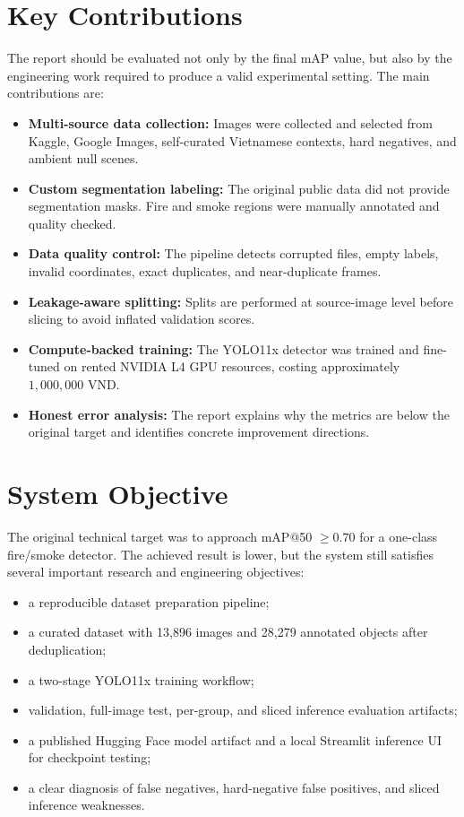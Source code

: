 \documentclass[12pt,a4paper]{report}
\begin{document}
\section{Key Contributions}
The report should be evaluated not only by the final mAP value, but also by the engineering work required to produce a valid experimental setting. The main contributions are:

\begin{itemize}
    \item \textbf{Multi-source data collection:} Images were collected and selected from Kaggle, Google Images, self-curated Vietnamese contexts, hard negatives, and ambient null scenes.
    \item \textbf{Custom segmentation labeling:} The original public data did not provide segmentation masks. Fire and smoke regions were manually annotated and quality checked.
    \item \textbf{Data quality control:} The pipeline detects corrupted files, empty labels, invalid coordinates, exact duplicates, and near-duplicate frames.
    \item \textbf{Leakage-aware splitting:} Splits are performed at source-image level before slicing to avoid inflated validation scores.
    \item \textbf{Compute-backed training:} The YOLO11x detector was trained and fine-tuned on rented NVIDIA L4 GPU resources, costing approximately \(1{,}000{,}000\) VND.
    \item \textbf{Honest error analysis:} The report explains why the metrics are below the original target and identifies concrete improvement directions.
\end{itemize}

\section{System Objective}
The original technical target was to approach mAP@50 \(\geq 0.70\) for a one-class fire/smoke detector. The achieved result is lower, but the system still satisfies several important research and engineering objectives:

\begin{itemize}
    \item a reproducible dataset preparation pipeline;
    \item a curated dataset with 13,896 images and 28,279 annotated objects after deduplication;
    \item a two-stage YOLO11x training workflow;
    \item validation, full-image test, per-group, and sliced inference evaluation artifacts;
    \item a published Hugging Face model artifact and a local Streamlit inference UI for checkpoint testing;
    \item a clear diagnosis of false negatives, hard-negative false positives, and sliced inference weaknesses.
\end{itemize}
\end{document}
